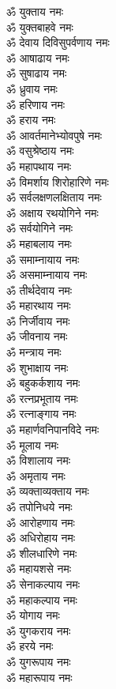 \begin{multicols}{2}
\begin{flushleft}
ॐ युक्ताय नमः\\
ॐ युक्तबाहवे नमः\\
ॐ देवाय दिविसुपर्वणाय नमः\\
ॐ आषाढाय नमः\\
ॐ सुषाढाय नमः\hfill{}\\
ॐ ध्रुवाय नमः\\
ॐ हरिणाय नमः\\
ॐ हराय नमः\\
ॐ आवर्तमानेभ्योवपुषे नमः\\
ॐ वसुश्रेष्ठाय नमः\\
ॐ महापथाय नमः\\
ॐ विमर्शाय शिरोहारिणे नमः\\
ॐ सर्वलक्षणलक्षिताय नमः\\
ॐ अक्षाय रथयोगिने नमः\\
ॐ सर्वयोगिने नमः\hfill{}\\
ॐ महाबलाय नमः\\
ॐ समाम्नायाय नमः\\
ॐ असमाम्नायाय नमः\\
ॐ तीर्थदेवाय नमः\\
ॐ महारथाय नमः\\
ॐ निर्जीवाय नमः\\
ॐ जीवनाय नमः\\
ॐ मन्त्राय नमः\\
ॐ शुभाक्षाय नमः\\
ॐ बहुकर्कशाय नमः\hfill{}\\
ॐ रत्नप्रभूताय नमः\\
ॐ रत्नाङ्गाय नमः\\
ॐ महार्णवनिपानविदे नमः\\
ॐ मूलाय नमः\\
ॐ विशालाय नमः\\
ॐ अमृताय नमः\\
ॐ व्यक्ताव्यक्ताय नमः\\
ॐ तपोनिधये नमः\\
ॐ आरोहणाय नमः\\
ॐ अधिरोहाय नमः\hfill{}\\
ॐ शीलधारिणे नमः\\
ॐ महायशसे नमः\\
ॐ सेनाकल्पाय नमः\\
ॐ महाकल्पाय नमः\\
ॐ योगाय नमः\\
ॐ युगकराय नमः\\
ॐ हरये नमः\\
ॐ युगरूपाय नमः\\
ॐ महारूपाय नमः\\

\end{flushleft}
\end{multicols}
